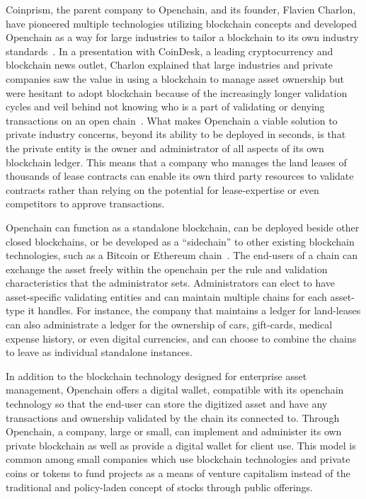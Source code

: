 Coinprism, the parent company to Openchain, and its founder, Flavien Charlon, have pioneered multiple technologies utilizing blockchain concepts and developed Openchain as a way for large industries to tailor a blockchain to its own industry standards~\cite{BitcoinNewsOpenchain}. In a presentation with CoinDesk, a leading cryptocurrency and blockchain news outlet, Charlon explained that large industries and private companies saw the value in using a blockchain to manage asset ownership but were hesitant to adopt blockchain because of the increasingly longer validation cycles and veil behind not knowing who is a part of validating or denying transactions on an open chain~\cite{CoinDeskCharlonYouTube}. What makes Openchain a viable solution to private industry concerns, beyond its ability to be deployed in seconds, is that the private entity is the owner and administrator of all aspects of its own blockchain ledger. This means that a company who manages the land leases of thousands of lease contracts can enable its own third party resources to validate contracts rather than relying on the potential for lease-expertise or even competitors to approve transactions.

Openchain can function as a standalone blockchain, can be deployed beside other closed blockchains, or be developed as a ``sidechain'' to other existing blockchain technologies, such as a Bitcoin or Ethereum chain~\cite{OpenchainHome}. The end-users of a chain can exchange the asset freely within the openchain  per the rule and validation characteristics that the administrator sets. Administrators can elect to have asset-specific validating entities and can maintain multiple chains for each asset-type it handles. For instance, the company that maintains a ledger for land-leases can also administrate a ledger for the ownership of cars, gift-cards, medical expense history, or even digital currencies, and can choose to combine the chains to leave as individual standalone instances.

In addition to the blockchain technology designed for enterprise asset management, Openchain offers a digital wallet, compatible with its openchain technology so that the end-user can store the digitized asset and have any transactions and ownership validated by the chain its connected to. Through Openchain, a company, large or small, can implement and administer its own private blockchain as well as provide a digital wallet for client use. This model is common among small companies which use blockchain technologies and private coins or tokens to fund projects as a means of venture capitalism instead of the traditional and policy-laden concept of stocks through public offerings.

